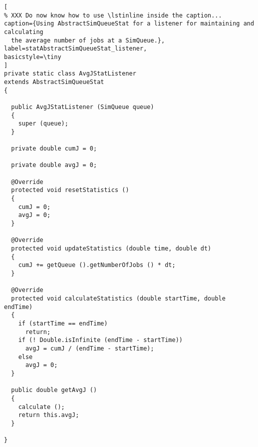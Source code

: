 \documentclass[12pt]{book}
\begin{document}
\begin{lstlisting}[
% XXX Do now know how to use \lstinline inside the caption...
caption={Using AbstractSimQueueStat for a listener for maintaining and calculating
  the average number of jobs at a SimQueue.},
label=statAbstractSimQueueStat_listener,
basicstyle=\tiny
]
private static class AvgJStatListener
extends AbstractSimQueueStat
{

  public AvgJStatListener (SimQueue queue)
  {
    super (queue);
  }
    
  private double cumJ = 0;
    
  private double avgJ = 0;
    
  @Override
  protected void resetStatistics ()
  {
    cumJ = 0;
    avgJ = 0;
  }

  @Override
  protected void updateStatistics (double time, double dt)
  {
    cumJ += getQueue ().getNumberOfJobs () * dt;
  }

  @Override
  protected void calculateStatistics (double startTime, double endTime)
  {
    if (startTime == endTime)
      return;
    if (! Double.isInfinite (endTime - startTime))
      avgJ = cumJ / (endTime - startTime);
    else
      avgJ = 0;
  }
    
  public double getAvgJ ()
  {
    calculate ();
    return this.avgJ;
  }
    
}
\end{lstlisting}
\end{document}
